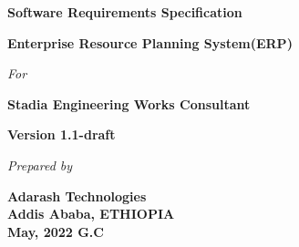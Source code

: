 \begin{titlepage}
\begin{center}
		\begin{LARGE}
			\bf{Software Requirements Specification}
		\end{LARGE}
		\vspace*{30pt}
		
		{\large \textbf{Enterprise Resource Planning System(ERP)}}
		\vspace{1.5\baselineskip}
		
		\textit{For}
		\vspace{1.5\baselineskip}
		
		{\large \textbf{Stadia Engineering Works Consultant}}
		\vspace{1.5\baselineskip}	
		
		{\large \textbf{Version 1.1-draft}}
		\vspace{3.5\baselineskip}
		
		
		\vspace{15\baselineskip}
		
		\textit{Prepared by}
		
		\textbf{Adarash Technologies\\
			Addis Ababa, ETHIOPIA\\
			May, 2022 G.C
		}
	
	\end{center}
\end{titlepage}